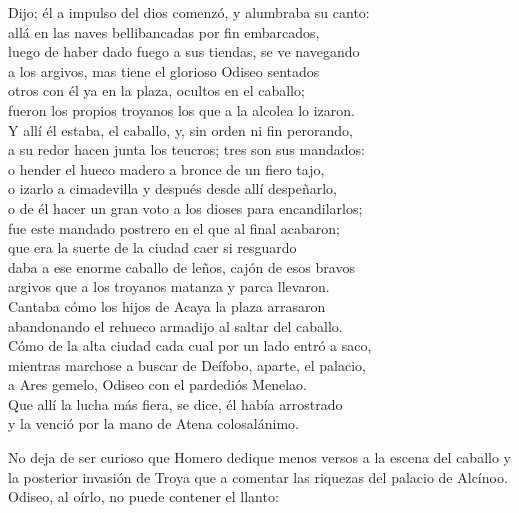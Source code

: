 \begin{versocita}
Dijo; él a impulso del dios comenzó, y alumbraba su canto:\\
allá en las naves bellibancadas por fin embarcados,\\
luego de haber dado fuego a sus tiendas, se ve navegando\\
a los argivos, mas tiene el glorioso Odiseo sentados\\
otros con él ya en la plaza, ocultos en el caballo;\\
fueron los propios troyanos los que a la alcolea lo izaron.\\
Y allí él estaba, el caballo, y, sin orden ni fin perorando,\\
a su redor hacen junta los teucros; tres son sus mandados:\\
o hender el hueco madero a bronce de un fiero tajo,\\
o izarlo a cimadevilla y después desde allí despeñarlo,\\
o de él hacer un gran voto a los dioses para encandilarlos;\\
fue este mandado postrero en el que al final acabaron;\\
que era la suerte de la ciudad caer si resguardo\\
daba a ese enorme caballo de leños, cajón de esos bravos\\
argivos que a los troyanos matanza y parca llevaron.\\
\stanzabreak
Cantaba cómo los hijos de Acaya la plaza arrasaron\\
abandonando el rehueco armadijo al saltar del caballo.\\
Cómo de la alta ciudad cada cual por un lado entró a saco,\\
mientras marchose a buscar de Deífobo, aparte, el palacio,\\
a Ares gemelo, Odiseo con el pardediós Menelao.\\
Que allí la lucha más fiera, se dice, él había arrostrado\\
y la venció por la mano de Atena colosalánimo.
\end{versocita}

No deja de ser curioso que Homero dedique menos versos a la escena del caballo y la posterior invasión de Troya que a comentar las riquezas del palacio de Alcínoo. Odiseo, al oírlo, no puede contener el llanto:


